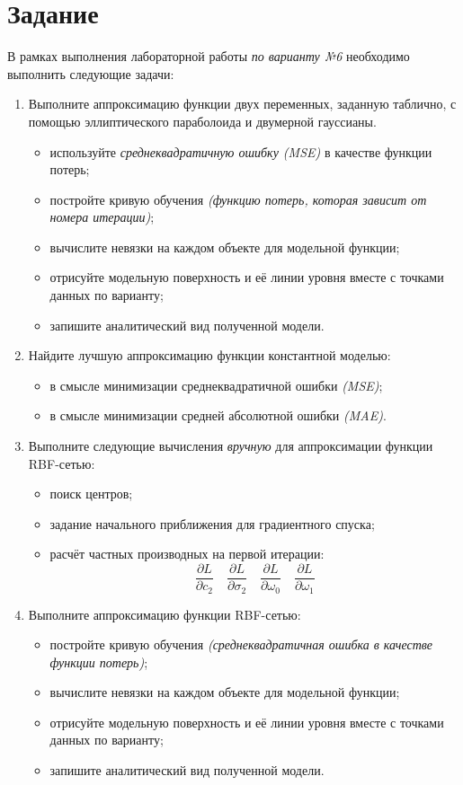 \section{Задание}

В рамках выполнения лабораторной работы \textit{по варианту №6} необходимо выполнить следующие задачи:
\begin{enumerate}
  \item Выполните аппроксимацию функции двух переменных, заданную таблично, с помощью эллиптического параболоида и двумерной гауссианы.
  \begin{itemize}
    \item используйте \textit{среднеквадратичную ошибку (MSE)} в качестве функции потерь;
    \item постройте кривую обучения \textit{(функцию потерь, которая зависит от номера итерации)};
    \item вычислите невязки на каждом объекте для модельной функции;
    \item отрисуйте модельную поверхность и её линии уровня вместе с точками данных по варианту;
    \item запишите аналитический вид полученной модели.
  \end{itemize}
  \item Найдите лучшую аппроксимацию функции константной моделью:
  \begin{itemize}
    \item в смысле минимизации среднеквадратичной ошибки \textit{(MSE)};
    \item в смысле минимизации средней абсолютной ошибки \textit{(MAE)}.
  \end{itemize}
  \item Выполните следующие вычисления \textit{вручную} для аппроксимации функции RBF-сетью:
  \begin{itemize}
    \item поиск центров;
    \item задание начального приближения для градиентного спуска;
    \item расчёт частных производных на первой итерации:
    \[
      \dfrac{\partial L}{\partial c_2}\quad
      \dfrac{\partial L}{\partial \sigma_2}\quad
      \dfrac{\partial L}{\partial \omega_0}\quad
      \dfrac{\partial L}{\partial \omega_1}
    \]
  \end{itemize}
  \item Выполните аппроксимацию функции RBF-сетью:
  \begin{itemize}
    \item постройте кривую обучения \textit{(среднеквадратичная ошибка в качестве функции потерь)};
    \item вычислите невязки на каждом объекте для модельной функции;
    \item отрисуйте модельную поверхность и её линии уровня вместе с точками данных по варианту;
    \item запишите аналитический вид полученной модели.
  \end{itemize}
\end{enumerate}

